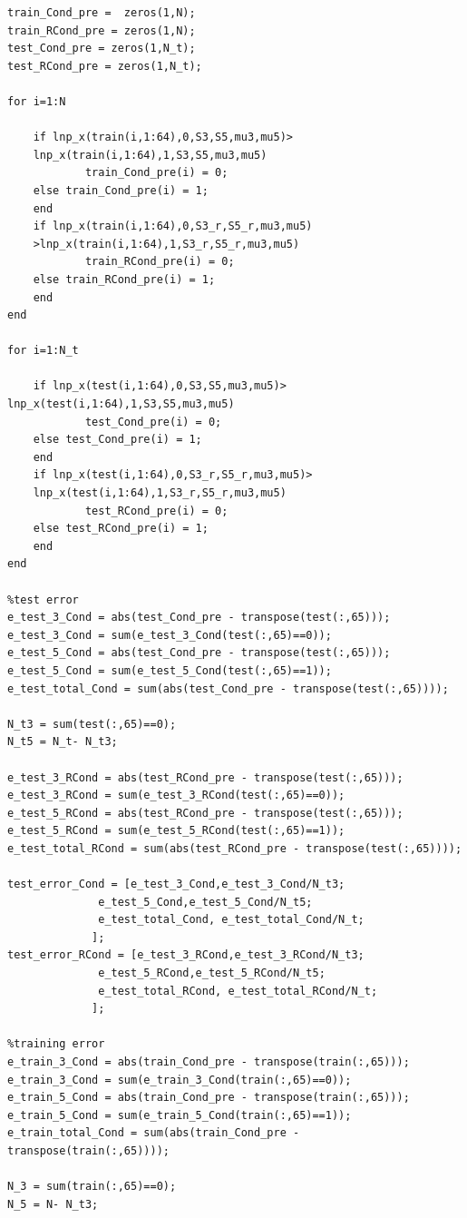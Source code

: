 \documentclass[12pt]{article}
\begin{document}
\begin{verbatim}
train_Cond_pre =  zeros(1,N);
train_RCond_pre = zeros(1,N);
test_Cond_pre = zeros(1,N_t);
test_RCond_pre = zeros(1,N_t);

for i=1:N
    
    if lnp_x(train(i,1:64),0,S3,S5,mu3,mu5)>
    lnp_x(train(i,1:64),1,S3,S5,mu3,mu5)
            train_Cond_pre(i) = 0;
    else train_Cond_pre(i) = 1;    
    end    
    if lnp_x(train(i,1:64),0,S3_r,S5_r,mu3,mu5)
    >lnp_x(train(i,1:64),1,S3_r,S5_r,mu3,mu5)
            train_RCond_pre(i) = 0;
    else train_RCond_pre(i) = 1;    
    end
end

for i=1:N_t
    
    if lnp_x(test(i,1:64),0,S3,S5,mu3,mu5)> lnp_x(test(i,1:64),1,S3,S5,mu3,mu5)
            test_Cond_pre(i) = 0;
    else test_Cond_pre(i) = 1;    
    end    
    if lnp_x(test(i,1:64),0,S3_r,S5_r,mu3,mu5)>
    lnp_x(test(i,1:64),1,S3_r,S5_r,mu3,mu5)
            test_RCond_pre(i) = 0;
    else test_RCond_pre(i) = 1;    
    end
end

%test error
e_test_3_Cond = abs(test_Cond_pre - transpose(test(:,65)));
e_test_3_Cond = sum(e_test_3_Cond(test(:,65)==0));
e_test_5_Cond = abs(test_Cond_pre - transpose(test(:,65)));
e_test_5_Cond = sum(e_test_5_Cond(test(:,65)==1));
e_test_total_Cond = sum(abs(test_Cond_pre - transpose(test(:,65))));

N_t3 = sum(test(:,65)==0);
N_t5 = N_t- N_t3;

e_test_3_RCond = abs(test_RCond_pre - transpose(test(:,65)));
e_test_3_RCond = sum(e_test_3_RCond(test(:,65)==0));
e_test_5_RCond = abs(test_RCond_pre - transpose(test(:,65)));
e_test_5_RCond = sum(e_test_5_RCond(test(:,65)==1));
e_test_total_RCond = sum(abs(test_RCond_pre - transpose(test(:,65))));

test_error_Cond = [e_test_3_Cond,e_test_3_Cond/N_t3;
              e_test_5_Cond,e_test_5_Cond/N_t5;
              e_test_total_Cond, e_test_total_Cond/N_t;
             ];
test_error_RCond = [e_test_3_RCond,e_test_3_RCond/N_t3;
              e_test_5_RCond,e_test_5_RCond/N_t5;
              e_test_total_RCond, e_test_total_RCond/N_t;
             ];

%training error
e_train_3_Cond = abs(train_Cond_pre - transpose(train(:,65)));
e_train_3_Cond = sum(e_train_3_Cond(train(:,65)==0));
e_train_5_Cond = abs(train_Cond_pre - transpose(train(:,65)));
e_train_5_Cond = sum(e_train_5_Cond(train(:,65)==1));
e_train_total_Cond = sum(abs(train_Cond_pre - transpose(train(:,65))));

N_3 = sum(train(:,65)==0);
N_5 = N- N_t3;


\end{verbatim}
\end{document}
